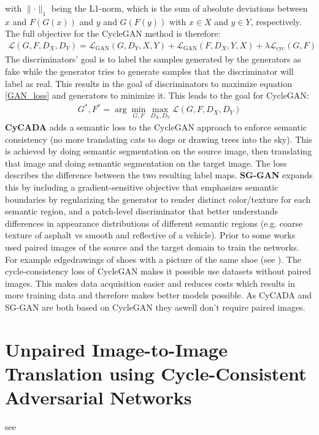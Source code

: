 with $\lVert \cdot \rVert_1$ being the L1-norm, which is the sum of absolute deviations between $x$ and $F(G(x))$ and $y$ and $G(F(y))$ with $x \in X$ and $y \in Y$, respectively. The full objective for the CycleGAN method is therefore:
\begin{align}
	\mathcal{L}(G,F,D_X,D_Y) = \mathcal{L}_{\text{GAN}}(G, D_Y, X, Y) + \mathcal{L}_{\text{GAN}}(F, D_X, Y, X) + \lambda \mathcal{L}_{\text{cyc}}(G, F)
\end{align}
The discriminators' goal is to label the samples generated by the generators as fake while the generator tries to generate samples that the discriminator will label as real. This results in the goal of discriminators to maximize equation \ref{GAN_loss} and generators to minimize it. This leads to the goal for CycleGAN: 
\begin{align}
	G^*, F^* = \arg \underset{G,F}{\min}\underset{D_X, D_Y}{\max} \mathcal{L}(G,F,D_X,D_Y) \label{GAN_goal}
\end{align}
\textbf{CyCADA} \cite{DBLP:journals/corr/abs-1711-03213} adds a semantic loss to the CycleGAN approach to enforce semantic consistency (no more translating cats to dogs or drawing trees into the sky). This is achieved by doing semantic segmentation on the source image, then translating that image and doing semantic segmentation on the target image. The loss describes the difference between the two resulting label maps. \textbf{SG-GAN} \cite{DBLP:journals/corr/abs-1801-01726} expands this by including a gradient-sensitive objective that emphasizes semantic boundaries by regularizing the generator to render distinct color/texture for each semantic region, and a patch-level discriminator that better understands differences in appearance distributions of different semantic regions (e.g. coarse texture of asphalt vs smooth and reflective of a vehicle). Prior to \cite{DBLP:journals/corr/ZhuPIE17} some works used paired images of the source and the target domain to train the networks. For example edgedrawings of shoes with a picture of the same shoe (see \cite{DBLP:journals/corr/IsolaZZE16}). The cycle-consistency loss of CycleGAN makes it possible use datasets without paired images. This makes data acquisition easier and reduces costs which results in more training data and therefore makes better models possible. As CyCADA and SG-GAN are both based on CycleGAN they aswell don't require paired images.




\section{Unpaired Image-to-Image Translation using Cycle-Consistent Adversarial Networks}
see \cite{DBLP:journals/corr/ZhuPIE17}

